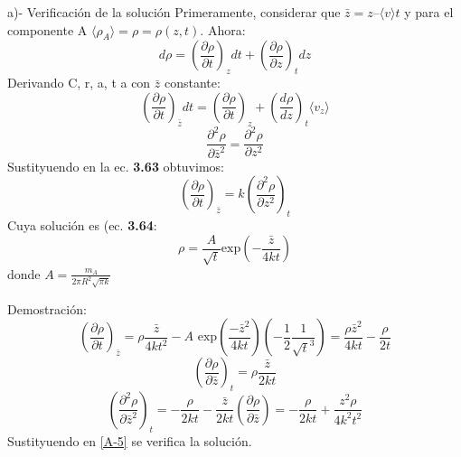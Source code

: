    a)- Verificación de la solución
    \newline
    Primeramente, considerar que $\bar{z}=z–\langle v\rangle t$ y para el componente A $\langle \rho_A \rangle=\rho =\rho (z,t)$. Ahora:
    \begin{equation*}
        d\rho=\left(\frac{\partial\rho}{\partial t}\right)_zdt+\left(\frac{\partial\rho}{\partial z}\right)_tdz
    \end{equation*}
    Derivando C, r, a, t a con $\bar{z}$ constante:
    \begin{equation*}
        \left(\frac{\partial\rho}{\partial t}\right)_{\bar{z}}dt=\left(\frac{\partial\rho}{\partial t}\right)_z+\left(\frac{d\rho}{dz}\right)_t\langle v_z\rangle
    \end{equation*}
    \begin{equation*}
        \frac{\partial^2 \rho}{\partial \bar{z}^2}=\frac{\partial^2 \rho}{\partial z^2}
    \end{equation*}
    Sustityuendo en la ec. \textbf{3.63} obtuvimos:
    \begin{equation*}
            \left(\frac{\partial\rho}{\partial t}\right)_{\bar{z}}=k\left(\frac{\partial^2 \rho}{\partial z^2}\right)_t
            \tag{A-5}
            \label{A-5}
    \end{equation*}
    Cuya solución es (ec. \textbf{3.64}:
    \begin{equation*}
        \rho=\frac{A}{\sqrt{t}}\text{exp}\left(-\frac{\bar{z}}{4kt}\right)
    \end{equation*}
    donde $A=\frac{m_A}{2\pi R^2 \sqrt{\pi k}}$
    
    \vspace{1 cm}
    Demostración:
    \begin{equation*}
         \left(\frac{\partial\rho}{\partial t}\right)_{\bar{z}}=\rho \frac{\bar{z}}{4kt^2}-A\text{ exp}\left(\frac{-\bar{z}^2}{4kt} \right) \left(-\frac{1}{2}\frac{1}{\sqrt{t}^3} \right)=\frac{\rho \bar{z}^2}{4kt}-\frac{\rho}{2t}
    \end{equation*}
    \begin{equation*}
         \left(\frac{\partial\rho}{\partial {\bar{z}}}\right)_t=\rho \frac{\bar{z}}{2kt}
    \end{equation*}
    \begin{equation*}
        \left( \frac{\partial^2 \rho}{\partial \bar{z}^2}\right)_t=-\frac{\rho}{2kt}-\frac{\bar{z}}{2kt} \left( \frac{\partial \rho}{\partial {\bar{z}}}\right)=-\frac{\rho}{2kt}+\frac{z^2 \rho}{4k^2t^2}
    \end{equation*}
    Sustityuendo en \eqref{A-5} se verifica la solución.\\

